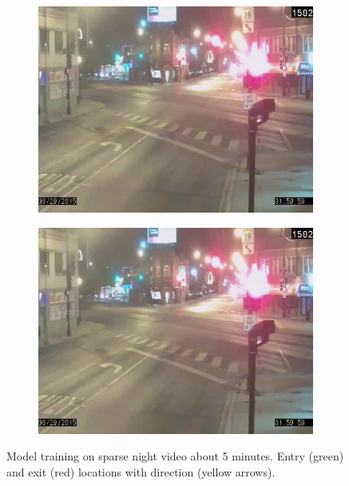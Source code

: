 \begin{figure}
        \begin{subfigure}{0.32\linewidth}
            \includegraphics[width=\linewidth]{./img/scene_learning/res/elstonIrvingPark-short/20150829_020000DST_elstonIrvingPark-3.jpg}
        \end{subfigure}
        \begin{subfigure}{0.32\linewidth}
            \includegraphics[width=\linewidth]{./img/scene_learning/res/elstonIrvingPark-short/20150829_020000DST_elstonIrvingPark-4.jpg}
        \end{subfigure}
        \caption{Model training on sparse night video about 5 minutes. Entry (green) and exit (red) locations with direction (yellow arrows).}
        \label{fig:entry-exit-night-1}
\end{figure}
